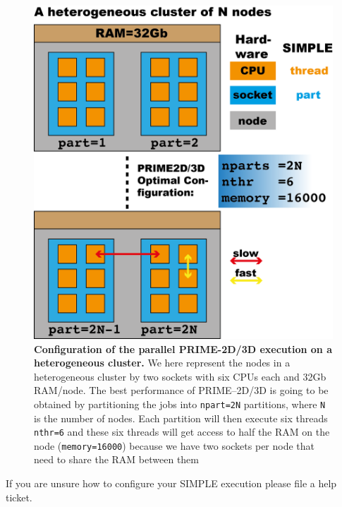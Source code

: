 \documentclass[a4paper,11pt]{article}
\begin{document}
\begin{figure}
\includegraphics[keepaspectratio=true,scale=0.6]{./CPUtopo/cputopo}
\caption{\textbf{Configuration of the parallel PRIME-2D/3D execution on a heterogeneous cluster.} We here represent the nodes in  a heterogeneous cluster by two sockets with six CPUs each and 32Gb RAM/node. The best performance of PRIME--2D/3D is going to be obtained by partitioning  the jobs into \texttt{npart=2N} partitions, where \texttt{N} is the number of nodes. Each partition will then execute six threads \texttt{nthr=6} and these six threads will get access to half the RAM on the node (\texttt{memory=16000}) because we have two sockets per node that need to share the RAM between them}
\end{figure}
If you are unsure how to configure your SIMPLE execution please file a help ticket.
\end{document}
